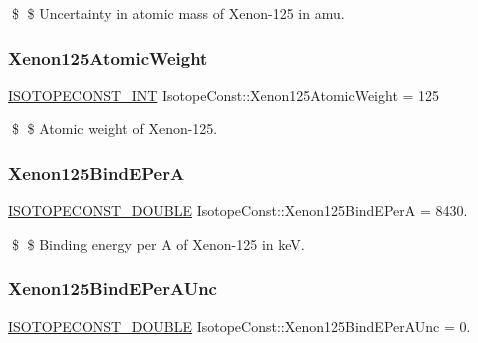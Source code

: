 \$ \$ Uncertainty in atomic mass of Xenon-\/125 in amu. \mbox{\label{group___isotope_const-_xenon-_xe125_ga6cc85dc5c6e91b521ebc3991229ee5dd}} 
\subsubsection{\texorpdfstring{Xenon125\+Atomic\+Weight}{Xenon125AtomicWeight}}
{\footnotesize\ttfamily \mbox{\hyperlink{group___isotope_const-_macros_ga5f18360b3e99483a35c32d789e62621c}{I\+S\+O\+T\+O\+P\+E\+C\+O\+N\+S\+T\+\_\+\+I\+NT}} Isotope\+Const\+::\+Xenon125\+Atomic\+Weight = 125}

\$ \$ Atomic weight of Xenon-\/125. \mbox{\label{group___isotope_const-_xenon-_xe125_ga64b740fd381e082f720033e18863f322}} 
\subsubsection{\texorpdfstring{Xenon125\+Bind\+E\+PerA}{Xenon125BindEPerA}}
{\footnotesize\ttfamily \mbox{\hyperlink{group___isotope_const-_macros_ga8f45a7272ce02c0b4c65c44636ed719a}{I\+S\+O\+T\+O\+P\+E\+C\+O\+N\+S\+T\+\_\+\+D\+O\+U\+B\+LE}} Isotope\+Const\+::\+Xenon125\+Bind\+E\+PerA = 8430.}

\$ \$ Binding energy per A of Xenon-\/125 in keV. \mbox{\label{group___isotope_const-_xenon-_xe125_ga2b33ba39666cf38f00cc6078455b4886}} 
\subsubsection{\texorpdfstring{Xenon125\+Bind\+E\+Per\+A\+Unc}{Xenon125BindEPerAUnc}}
{\footnotesize\ttfamily \mbox{\hyperlink{group___isotope_const-_macros_ga8f45a7272ce02c0b4c65c44636ed719a}{I\+S\+O\+T\+O\+P\+E\+C\+O\+N\+S\+T\+\_\+\+D\+O\+U\+B\+LE}} Isotope\+Const\+::\+Xenon125\+Bind\+E\+Per\+A\+Unc = 0.}

